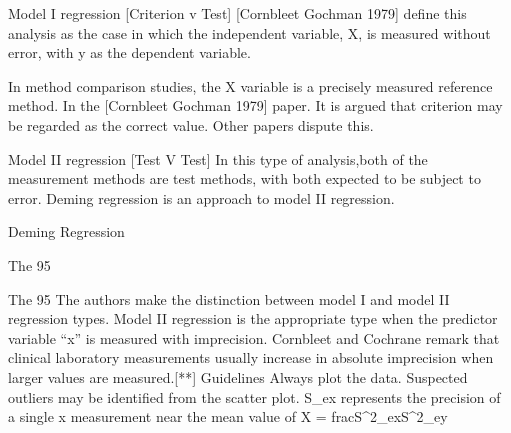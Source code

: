 
Model I regression [Criterion v Test]
[Cornbleet Gochman 1979] define this analysis as the case in which the independent variable, X, is measured without error, with y as the dependent variable.
 
In method comparison studies, the X variable is a precisely measured reference method. In the [Cornbleet Gochman 1979] paper. It is argued that criterion may be regarded as the correct value. Other papers dispute this.
 
 
Model II regression [Test V Test]
In this type of analysis,both of the measurement methods are test methods, with both expected to be subject to error. Deming regression is an approach to model II regression.

Deming Regression

 

The 95%

 

The 95%
The authors make the distinction between model I and model II regression types.
Model II regression is the appropriate type when the predictor variable “x” is measured with imprecision.
Cornbleet and Cochrane remark that clinical laboratory measurements usually increase in absolute imprecision when larger values are measured.[**]
Guidelines
Always plot the data. Suspected outliers may be identified from the scatter plot.
S_{ex}  represents the precision of a single x measurement near the mean value of X
\lambda = frac{S^2_{ex}}{S^2_{ey}}



